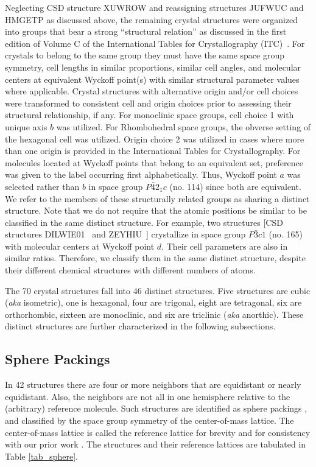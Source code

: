 \documentclass{iucr}              %
\begin{document}
Neglecting CSD structure XUWROW and reassigning structures JUFWUC and HMGETP as discussed above, the remaining crystal structures were organized into groups that bear a strong ``structural relation'' as discussed in the first edition of Volume C of the International Tables for Crystallography (ITC)~\cite{Hahn83}. For crystals to belong to the same group they must have the same space group symmetry, cell lengths in similar proportions, similar cell angles, and molecular centers at equivalent Wyckoff point(s) with similar structural parameter values where applicable.  Crystal structures with alternative origin and/or cell choices were transformed to consistent cell and origin choices prior to assessing their structural relationship, if any.  For monoclinic space groups, cell choice 1 with unique axis $b$ was utilized.  For Rhombohedral space groups, the obverse setting of the hexagonal cell was utilized.  Origin choice 2 was utilized in cases where more than one origin is provided in the International Tables for Crystallography.  For molecules located at Wyckoff points that belong to an equivalent set, preference was given to the label occurring first alphabetically.  Thus, Wyckoff point $a$ was selected rather than $b$ in space group $P\bar{4}2_1c$ (no. 114) since both are equivalent.  We refer to the members of these structurally related groups as sharing a distinct structure. Note that we do not require that the atomic positions be similar to be classified in the same distinct structure. For example, two structures [CSD structures DILWIE01~\cite{Ebert98} and ZEYHIU~\cite{Noth95}] crystallize in space group $P\bar{3}c1$ (no. 165) with molecular centers at Wyckoff point $d$. Their cell parameters are also in similar ratios. Therefore, we classify them in the same distinct structure, despite their different chemical structures with different numbers of atoms.

The 70 crystal structures fall into 46 distinct structures. Five structures are cubic (\textit{aka} isometric), one is hexagonal, four are trigonal, eight are tetragonal, six are orthorhombic, sixteen are monoclinic, and six are triclinic (\textit{aka} anorthic).  These distinct structures are further characterized in the following subsections.

\subsection{Sphere Packings}

In 42 structures there are four or more neighbors that are equidistant or nearly equidistant.  Also, the neighbors are not all in one hemisphere relative to the (arbitrary) reference molecule.  Such structures are identified as sphere packings \cite{Conway98}, and classified by the space group symmetry of the center-of-mass lattice.  The center-of-mass lattice is called the reference lattice for brevity and for consistency with our prior work \cite{Keith04c,Mettes04}.  The structures and their reference lattices are tabulated in Table \ref{tab_sphere}.
\end{document}
